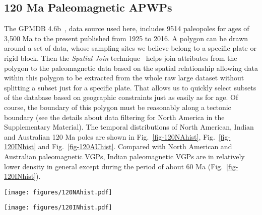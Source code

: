 \subsection{120 Ma Paleomagnetic APWPs}

The GPMDB 4.6b~\cite{P05}, data source used here, includes 9514 paleopoles for
ages of 3,500 Ma to the present published from 1925 to 2016. A polygon can be
drawn around a set of data, whose sampling sites we believe belong to a specific
plate or rigid block. Then the {\em Spatial Join\/} technique~\cite{J07} helps
join attributes from the polygon to the paleomagnetic data based on the spatial
relationship allowing data within this polygon to be extracted from the whole
raw large dataset without splitting a subset just for a specific plate. That
allows us to quickly select subsets of the database based on geographic
constraints just as easily as for age. Of course, the boundary of this polygon
must be reasonably along a tectonic boundary (see the details about data
filtering for North America in the Supplementary Material). The temporal
distributions of North American, Indian and Australian 120 Ma poles
are shown in Fig.~\ref{fig-120NAhist}, Fig.~\ref{fig-120INhist} and
Fig.~\ref{fig-120AUhist}. Compared with North American and Australian
paleomagnetic VGPs, Indian paleomagnetic VGPs are in relatively lower density
in general except during the period of about 60 Ma
(Fig.~\ref{fig-120INhist}).

\begin{figure*}
\centering
\texttt{[image: figures/120NAhist.pdf]}
\caption[Distribution of 120 Ma North American poles]{Temporal
distribution of 120 Ma $NAC$ (101) paleomagnetic poles in 10 Myr
binning and 5 Myr step. For distribution a, each bin only counts in the
midpoints of pole error bars (not including those right at bin edges); For
distribution b, as long as the bar intersects with the bin (not including those
intersecting only at one of bin edges), it is counted in. Inside the
parentheses, i means igneous rocks derived (red bars), r means sedimentary rocks
with redbeds involved derived (orange bars), and m means metamorphic-dominated
rocks derived (blue bars); the left are pure sedimentary rocks derived (black
bars). The midpoints published not later than 1983 are black-dotted.}\label{fig-120NAhist}
\end{figure*}

\begin{figure*}
\centering
\texttt{[image: figures/120INhist.pdf]}
\caption[Distribution of 120 Ma Indian poles]{Temporal distribution
of 120 Ma Indian (501) paleomagnetic poles. See
Fig.~\ref{fig-120NAhist} for more information.}\label{fig-120INhist}
\end{figure*}

